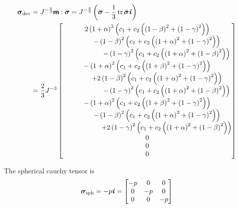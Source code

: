 \begin{equation}
  \begin{split}
    \tensor{\sigma}_{\devop}&=J^{-\frac{4}{3}}\doubledotprod{\tensorfour{m}}{\bar{\tensor{\sigma}}}=J^{-\frac{4}{3}}\pbrac{\bar{\tensor{\sigma}}-\frac{1}{3}\trace{}{\bar{\tensor{\sigma}}}\tensor{i}}\\
    &=\dfrac{2}{3}J^{-3}\begin{bmatrix}
      2\pbrac{1+\alpha}^{2}\pbrac{c_{1}+c_{2}\pbrac{\pbrac{1-\beta}^{2}+\pbrac{1-\gamma}^{2}}}\\
      \hspace{1cm}-\pbrac{1-\beta}^{2}\pbrac{c_{1}+c_{2}\pbrac{\pbrac{1+\alpha}^{2}+\pbrac{1-\gamma}^{2}}}\\
      \hspace{2cm}-\pbrac{1-\gamma}^{2}\pbrac{c_{1}+c_{2}\pbrac{\pbrac{1+\alpha}^{2}+\pbrac{1-\beta}^{2}}} \\
      -\pbrac{1+\alpha}^{2}\pbrac{c_{1}+c_{2}\pbrac{\pbrac{1+\beta}^{2}+\pbrac{1-\gamma}^{2}}}\\
      \hspace{1cm}+2\pbrac{1-\beta}^{2}\pbrac{c_{1}+c_{2}\pbrac{\pbrac{1+\alpha}^{2}+\pbrac{1-\gamma}^{2}}}\\
      \hspace{2cm}-\pbrac{1-\gamma}^{2}\pbrac{c_{1}+c_{2}\pbrac{\pbrac{1+\alpha}^{2}+\pbrac{1-\beta}^{2}}} \\
      -\pbrac{1+\alpha}^{2}\pbrac{c_{1}+c_{2}\pbrac{\pbrac{1+\beta}^{2}+\pbrac{1-\gamma}^{2}}}\\
      \hspace{1cm}-\pbrac{1-\beta}^{2}\pbrac{c_{1}+c_{2}\pbrac{\pbrac{1+\alpha}^{2}+\pbrac{1-\gamma}^{2}}}\\
      \hspace{2cm}+2\pbrac{1-\gamma}^{2}\pbrac{c_{1}+c_{2}\pbrac{\pbrac{1+\alpha}^{2}+\pbrac{1-\beta}^{2}}}\\
      0 \\
      0 \\
      0
    \end{bmatrix}
  \end{split}
\end{equation}

The spherical cauchy tensor is
\begin{equation}
  \boldsymbol{\mathit{\sigma}}_{\operatorname{sph}}=-p\boldsymbol{\mathit{i}}=\begin{bmatrix}
  -p & 0 & 0\\
  0 & -p & 0\\
  0 & 0 & -p
  \end{bmatrix}
\end{equation}

